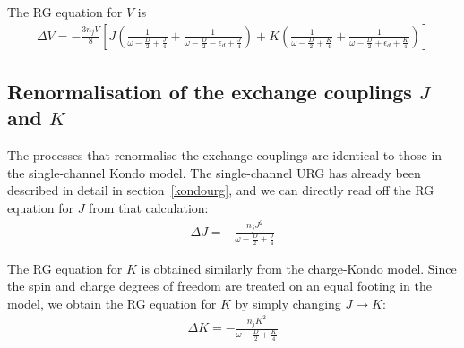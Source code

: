 The RG equation for \(V\) is
\begin{equation}\begin{aligned}
	\Delta V = -\frac{3n_j V}{8}\left[J\left(\frac{1}{\omega - \frac{D}{2} + \frac{J}{4}} + \frac{1}{\omega - \frac{D}{2} - \epsilon_d + \frac{J}{4}}\right) + K \left(\frac{1}{\omega - \frac{D}{2} + \frac{K}{4}} + \frac{1}{\omega - \frac{D}{2} + \epsilon_d + \frac{K}{4}}\right)\right]
\end{aligned}\end{equation}

\subsection{Renormalisation of the exchange couplings \(J\) and \(K\)}
The processes that renormalise the exchange couplings are identical to those in the single-channel Kondo model. The single-channel URG has already been  described in detail in section~\ref{kondourg}, and we can directly read off the RG equation for \(J\) from that calculation:
\begin{equation}\begin{aligned}
	\Delta J = -\frac{n_j J^2}{\omega - \frac{D}{2} + \frac{J}{4}}
\end{aligned}\end{equation}

The RG equation for \(K\) is obtained similarly from the charge-Kondo model. Since the spin and charge degrees of freedom are treated on an equal footing in the model, we obtain the RG equation for \(K\) by simply changing \(J \to K\):
\begin{equation}\begin{aligned}
	\Delta K = -\frac{n_j K^2}{\omega - \frac{D}{2} + \frac{K}{4}}
\end{aligned}\end{equation}

